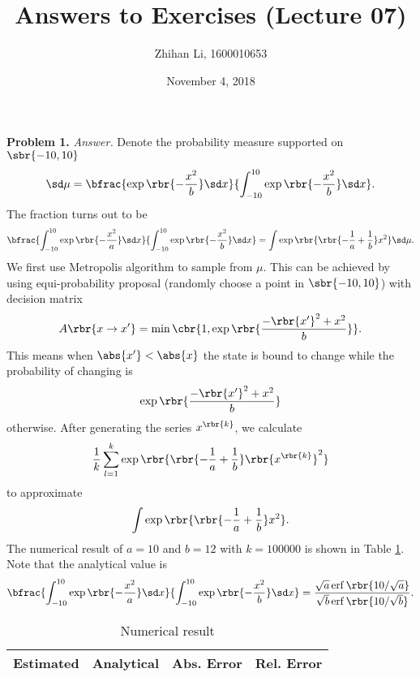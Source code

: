 \documentclass[english, nochinese]{pnote}
\title{Answers to Exercises (Lecture 07)}
\author{Zhihan Li, 1600010653}
\date{November 4, 2018}
\DeclareMathOperator\operf{\mathrm{erf}}
\begin{document}
\maketitle

\textbf{Problem 1.} \textit{Answer.} Denote the probability measure supported on $ \sbr{ -10, 10 } $
\begin{equation}
\sd \mu = \bfrac{ \exp \rbr{-\frac{x^2}{b}} \sd x }{ \int_{-10}^{10} \exp \rbr{-\frac{x^2}{b}} \sd x }.
\end{equation}
The fraction turns out to be
\begin{equation}
\bfrac{ \int_{-10}^{10} \exp \rbr{-\frac{x^2}{a}} \sd x }{ \int_{-10}^{10} \exp \rbr{-\frac{x^2}{b}} \sd x } = \int \exp \rbr{ \rbr{ -\frac{1}{a} + \frac{1}{b} } x^2 } \sd \mu.
\end{equation}
We first use Metropolis algorithm to sample from $\mu$. This can be achieved by using equi-probability proposal (randomly choose a point in $ \sbr{ -10, 10 } $) with decision matrix
\begin{equation}
A \rbr{ x \rightarrow x' } = \min \cbr{ 1, \exp \rbr{ \frac{ -\rbr{x'}^2 + x^2 }{b} } }.
\end{equation}
This means when $ \abs{x'} < \abs{x} $ the state is bound to change while the probability of changing is
\begin{equation}
\exp \rbr{ \frac{ -\rbr{x'}^2 + x^2 }{b} }
\end{equation}
otherwise. After generating the series $x^{\rbr{k}}$, we calculate
\begin{equation}
\frac{1}{k} \sum_{ l = 1 }^k \exp \rbr{ \rbr{ -\frac{1}{a} + \frac{1}{b} } \rbr{x^{\rbr{k}}}^2 }
\end{equation}
to approximate
\begin{equation}
\int \exp \rbr{ \rbr{ -\frac{1}{a} + \frac{1}{b} } x^2 }.
\end{equation}
The numerical result of $ a = 10 $ and $ b = 12 $ with $ k = 100000 $ is shown in Table \ref{Tbl:Res}. Note that the analytical value is
\begin{equation}
\bfrac{ \int_{-10}^{10} \exp \rbr{-\frac{x^2}{a}} \sd x }{ \int_{-10}^{10} \exp \rbr{-\frac{x^2}{b}} \sd x } = \frac{ \sqrt{a} \operf \rbr{ 10 / \sqrt{a} } }{ \sqrt{b} \operf \rbr{ 10 / \sqrt{b} } }.
\end{equation}

\begin{table}[htb]
\centering
\begin{tabular}{|c|c|c|c|}
\hline
Estimated & Analytical & Abs. Error & Rel. Error \\
\hline

\end{tabular}
\caption{Numerical result}
\label{Tbl:Res}
\end{table}
\end{document}
